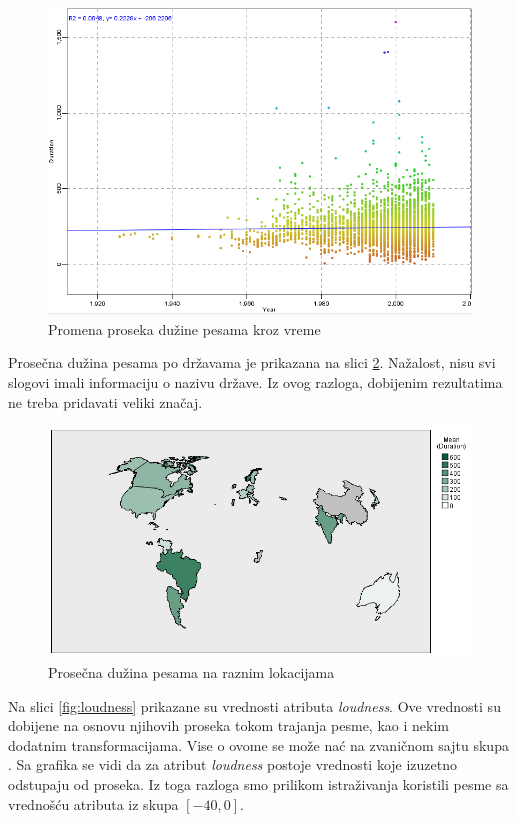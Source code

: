 \begin{figure}[H]
    \centering
    \includegraphics[scale=0.6]{resources/year-duration.PNG}
    \caption{Promena proseka du\v{z}ine pesama kroz vreme}
    \label{fig:YearDurationAvg}
\end{figure}


Prose\v{c}na du\v{z}ina pesama po dr\v{z}avama je prikazana na slici \ref{fig:CountryDuration}. Na\v{z}alost, nisu svi slogovi imali informaciju o nazivu dr\v{z}ave. Iz ovog razloga, dobijenim rezultatima ne treba pridavati veliki zna\v{c}aj.

\begin{figure}[H]
    \centering
    \includegraphics[scale=0.45]{resources/country-duration.png}
    \caption{Prose\v{c}na du\v{z}ina pesama na raznim lokacijama}
    \label{fig:CountryDuration}
\end{figure}


Na slici \ref{fig:loudness} prikazane su vrednosti atributa \emph{loudness}. Ove vrednosti su dobijene na osnovu njihovih proseka tokom trajanja pesme, kao i nekim dodatnim transformacijama. Vise o ovome se mo\v{z}e na\'c{} na zvani\v{c}nom sajtu skupa \cite{Dataset}. Sa grafika se vidi da za atribut \emph{loudness} postoje vrednosti koje izuzetno odstupaju od proseka. Iz toga razloga smo prilikom istra\v{z}ivanja koristili pesme sa vredno\v{s}\'c{}u atributa iz skupa $[-40, 0]$.

